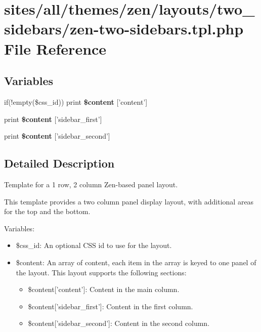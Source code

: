 \hypertarget{zen-two-sidebars_8tpl_8php}{
\section{sites/all/themes/zen/layouts/two\_\-sidebars/zen-two-sidebars.tpl.php File Reference}
\label{zen-two-sidebars_8tpl_8php}
}
\subsection*{Variables}
\begin{CompactItemize}
\item 
\hypertarget{zen-two-sidebars_8tpl_8php_16767ac2e2b027ec00a0c12535d2ba7a}{
if(!empty(\$css\_\-id)) print \textbf{\$content} \mbox{[}'content'\mbox{]}}
\label{zen-two-sidebars_8tpl_8php_16767ac2e2b027ec00a0c12535d2ba7a}

\item 
\hypertarget{zen-two-sidebars_8tpl_8php_8fbe76276dfb5a084cc042c32e8e6394}{
print \textbf{\$content} \mbox{[}'sidebar\_\-first'\mbox{]}}
\label{zen-two-sidebars_8tpl_8php_8fbe76276dfb5a084cc042c32e8e6394}

\item 
\hypertarget{zen-two-sidebars_8tpl_8php_4f8fb8ae436a00e7bdfe8b16bc3f0dd4}{
print \textbf{\$content} \mbox{[}'sidebar\_\-second'\mbox{]}}
\label{zen-two-sidebars_8tpl_8php_4f8fb8ae436a00e7bdfe8b16bc3f0dd4}

\end{CompactItemize}


\subsection{Detailed Description}
Template for a 1 row, 2 column Zen-based panel layout.

This template provides a two column panel display layout, with additional areas for the top and the bottom.

Variables:\begin{itemize}
\item \$css\_\-id: An optional CSS id to use for the layout.\item \$content: An array of content, each item in the array is keyed to one panel of the layout. This layout supports the following sections:\begin{itemize}
\item \$content\mbox{[}'content'\mbox{]}: Content in the main column.\item \$content\mbox{[}'sidebar\_\-first'\mbox{]}: Content in the first column.\item \$content\mbox{[}'sidebar\_\-second'\mbox{]}: Content in the second column. \end{itemize}
\end{itemize}

